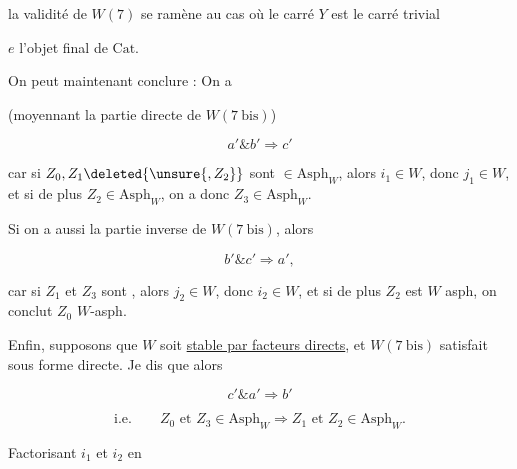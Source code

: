 la validité de $W(7)$ se ramène au cas où le carré $Y$ est le carré trivial


$e$ l'objet final de $\mathrm{Cat}$.

On peut maintenant conclure :  On a


(moyennant la partie directe de $W(7\ \mathrm{bis})$)

\[
a'\mathbin{\&}b'\Longrightarrow c'
\]

car si $Z_0,Z_1\deleted{\unsure{,Z_2}}$ sont $\in\mathrm{Asph}_W$, alors $i_1\in W$, donc $j_1\in W$, et si de plus $Z_2\in\mathrm{Asph}_W$, on a donc $Z_3\in\mathrm{Asph}_W$.

Si on a aussi la partie inverse  de $W(7\ \mathrm{bis})$, alors

\[
b'\mathbin{\&}c'\Longrightarrow a',
\]

car si $Z_1$ et $Z_3$ sont , alors $j_2\in W$, donc $i_2\in W$, et si de plus $Z_2$ est $W$ asph, on conclut $Z_0$ $W$-asph.

Enfin, supposons que $W$ soit \uline{stable par facteurs directs}, et $W(7\ \mathrm{bis})$ satisfait sous forme directe. Je dis que alors

\[
c'\mathbin{\&}a'\Longrightarrow b'
\]

\[
\text{i.e.}\qquad Z_0\text{ et } Z_3\in\mathrm{Asph}_W\Longrightarrow Z_1\text{ et }Z_2\in\mathrm{Asph}_W.
\]

Factorisant $i_1$ et $i_2$ en



